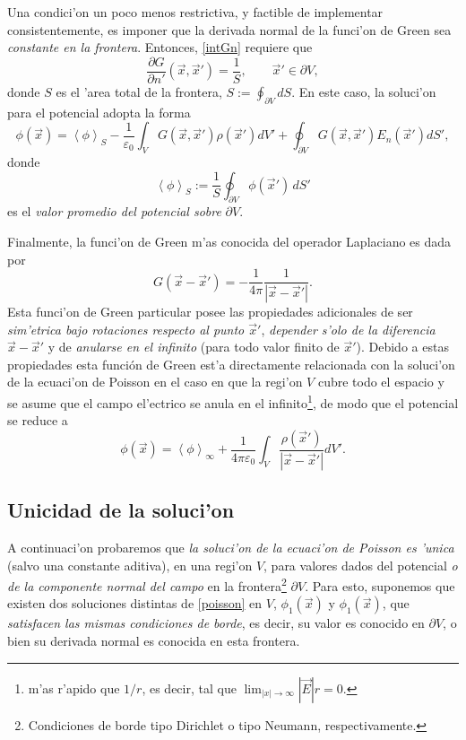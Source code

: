 Una condici'on un poco menos restrictiva, y factible de implementar consistentemente, es imponer que la derivada normal de la funci'on de Green sea \textit{constante en la frontera}. Entonces, \eqref{intGn} requiere que
\begin{equation}
\frac{\partial G}{\partial n'}(\vec{x},\vec{x}')=\frac{1}{S}, \qquad \vec{x}'\in\partial V,
\end{equation}
donde $S$ es el 'area total de la frontera, $S:=\oint_{\partial V} dS$. En este caso, la soluci'on para el potencial adopta la forma
\begin{equation}
\phi(\vec{x})= \left\langle\phi\right\rangle_S-\frac{1}{\varepsilon_0}\int_VG(\vec{x},\vec{x}') \rho(\vec{x}')dV'+\oint_{\partial V}G(\vec{x},\vec{x}')E_n(\vec{x}')dS',
\end{equation}
donde
\begin{equation}
\left\langle\phi\right\rangle_S:=\frac{1}{S}\oint_{\partial V}\phi(\vec{x}')\,dS'
\end{equation}
es el \textit{valor promedio del potencial sobre} $\partial V$.

Finalmente, la funci'on de Green m'as conocida del operador Laplaciano es dada por
\begin{equation}
G(\vec{x}-\vec{x}')=-\frac{1}{4\pi}\frac{1}{|\vec{x}-\vec{x}'|}.
\end{equation}
Esta funci'on de Green particular posee las propiedades adicionales de ser \textit{sim'etrica bajo rotaciones respecto al punto $\vec{x}'$}, \textit{depender s'olo de la diferencia $\vec{x}-\vec{x}'$} y de \textit{anularse en el infinito} (para todo valor finito de $\vec{x}'$). Debido a estas propiedades esta función de Green est'a directamente relacionada con la soluci'on de la ecuaci'on de Poisson en el caso en que la regi'on $V$ cubre todo el espacio y se asume que el campo el'ectrico se anula en el infinito\footnote{m'as r'apido que $1/r$, es decir, tal que $\lim_{|x|\to\infty}|\vec{E}|r=0$.}, de modo que el potencial se reduce a
\begin{equation}
\phi(\vec{x})= \left\langle\phi\right\rangle_\infty+\frac{1}{4\pi\varepsilon_0}\int_V\frac{\rho(\vec{x}')}{|\vec{x}-\vec{x}'|}dV'.
\end{equation}

\subsection{Unicidad de la soluci'on}\label{sec:uniP}
A continuaci'on probaremos que \textit{la soluci'on de la ecuaci'on de Poisson es 'unica} (salvo una constante aditiva), en una regi'on $V$, para valores dados del potencial \textit{o de la componente normal del campo} en la frontera\footnote{Condiciones de borde tipo Dirichlet o tipo Neumann, respectivamente.} $\partial V$. Para esto, suponemos que existen dos soluciones distintas de \eqref{poisson} en $V$, $\phi_1(\vec{x})$ y $\phi_1(\vec{x})$, que \textit{satisfacen las mismas condiciones de borde}, es decir, su valor es conocido en $\partial V$, o bien su derivada normal es conocida en esta frontera.

